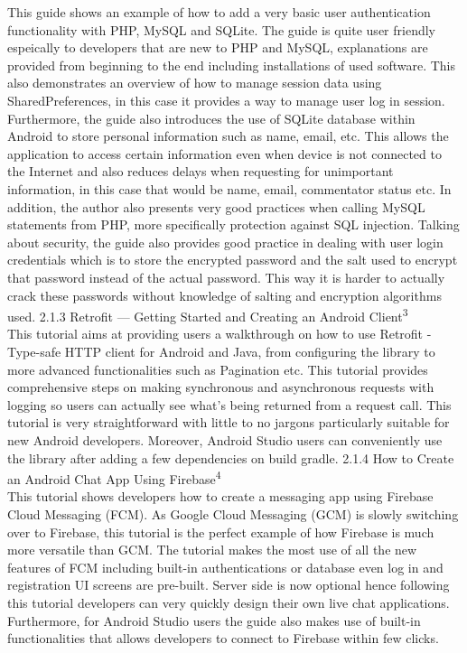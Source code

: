 \documentclass{article}
\begin{document}
\begin{flushleft}
This guide shows an example of how to add a very basic user authentication functionality with PHP, MySQL and SQLite. The guide is quite user friendly espeically to developers that are new to PHP and MySQL, explanations are provided from beginning to the end including installations of used software. This also demonstrates an overview of how to manage session data using SharedPreferences, in this case it provides a way to manage user log in session. Furthermore, the guide also introduces the use of SQLite database within Android to store personal information such as name, email, etc. This allows the application to access certain information even when device is not connected to the Internet and also reduces delays when requesting for unimportant information, in this case that would be name, email, commentator status etc. In addition, the author also presents very good practices when calling MySQL statements from PHP, more specifically protection against SQL injection. Talking about security, the guide also provides good practice in dealing with user login credentials which is to store the encrypted password and the salt used to encrypt that password instead of the actual password. This way it is harder to actually crack these passwords without knowledge of salting and encryption algorithms used.
{\large 2.1.3 Retrofit — Getting Started and Creating an Android Client\textsuperscript{3}}\\
This tutorial aims at providing users a walkthrough on how to use Retrofit - Type-safe HTTP client for Android and Java, from configuring the library to more advanced functionalities such as Pagination etc. This tutorial provides comprehensive steps on making synchronous and asynchronous requests with logging so users can actually see what's being returned from a request call. This tutorial is very straightforward with little to no jargons particularly suitable for new Android developers. Moreover, Android Studio users can conveniently use the library after adding a few dependencies on build gradle. 
{\large 2.1.4 How to Create an Android Chat App Using Firebase\textsuperscript{4}}\\
This tutorial shows developers how to create a messaging app using Firebase Cloud Messaging (FCM). As Google Cloud Messaging (GCM) is slowly switching over to Firebase, this tutorial is the perfect example of how Firebase is much more versatile than GCM. The tutorial makes the most use of all the new features of FCM including built-in authentications or database even log in and registration UI screens are pre-built. Server side is now optional hence following this tutorial developers can very quickly design their own live chat applications. Furthermore, for Android Studio users the guide also makes use of built-in functionalities that allows developers to connect to Firebase within few clicks.\\

\end{flushleft}
\end{document}
